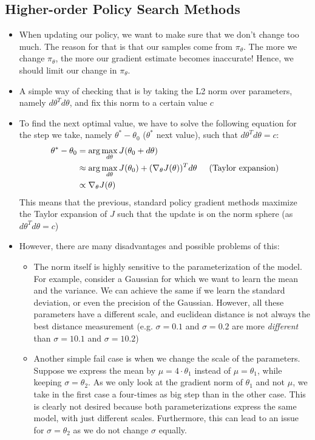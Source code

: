\subsection{Higher-order Policy Search Methods}
\begin{itemize}
	\item When updating our policy, we want to make sure that we don't change too much. The reason for that is that our samples come from $\pi_{\theta}$. The more we change $\pi_{\theta}$, the more our gradient estimate becomes inaccurate! Hence, we should limit our change in $\pi_{\theta}$.
	\item A simple way of checking that is by taking the L2 norm over parameters, namely $d\theta^T d\theta$, and fix this norm to a certain value $c$
	\item To find the next optimal value, we have to solve the following equation for the step we take, namely $\theta^{*}-\theta_0$ ($\theta^{*}$ next value), such that $d\theta^T d\theta=c$:
	\begin{equation*}
		\begin{split}
			\theta^{*}-\theta_0 & = \arg\max_{d\theta} J(\theta_0 + d\theta)\\
			& \approx \arg\max_{d\theta} J(\theta_0) + (\nabla_{\theta} J(\theta))^T d\theta \hspace{5mm}\text{(Taylor expansion)}\\
			& \propto \nabla_{\theta} J(\theta)
		\end{split}
	\end{equation*}
	This means that the previous, standard policy gradient methods maximize the Taylor expansion of $J$ such that the update is on the norm sphere (as $d\theta^T d\theta=c$)
	\item However, there are many disadvantages and possible problems of this:
	\begin{itemize}
		\item The norm itself is highly sensitive to the parameterization of the model. For example, consider a Gaussian for which we want to learn the mean and the variance. We can achieve the same if we learn the standard deviation, or even the precision of the Gaussian. However, all these parameters have a different scale, and euclidean distance is not always the best distance measurement (e.g. $\sigma=0.1$ and $\sigma=0.2$ are more \textit{different} than $\sigma=10.1$ and $\sigma=10.2$)
		\item Another simple fail case is when we change the scale of the parameters. Suppose we express the mean by $\mu=4\cdot \theta_1$ instead of $\mu=\theta_1$, while keeping $\sigma=\theta_2$. As we only look at the gradient norm of $\theta_1$ and not $\mu$, we take in the first case a four-times as big step than in the other case. This is clearly not desired because both parameterizations express the same model, with just different scales. Furthermore, this can lead to an issue for $\sigma=\theta_2$ as we do not change $\sigma$ equally.

\end{itemize}
\end{itemize}
